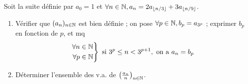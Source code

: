 

\begin{statementbox}
Soit la suite définie par $a_0 = 1$ et $\forall n \in \mathbb N, a_n = 2 a_{\lfloor n/3 \rfloor} + 3 a_{\lfloor n/9 \rfloor}$.
\begin{enumerate}[label=\alph*)]
  \item Vérifier que $(a_n)_{n \in \mathbb N}$ est bien définie ; on pose $\forall p \in \mathbb N, b_p = a_{3^p}$ ; exprimer $b_p$ en fonction de $p$, et mq
  \[
  \left. \begin{aligned} \forall n \in \mathbb N \\ \forall p \in \mathbb N \end{aligned} \right\} \text{ si } 3^p \leq n < 3^{p+1}, \text{ on a } a_n = b_p
  \]
  \item Déterminer l'ensemble des v.a. de $\left( \frac{a_n}{n} \right)_{n \in \mathbb N}$.
\end{enumerate}
\end{statementbox}

